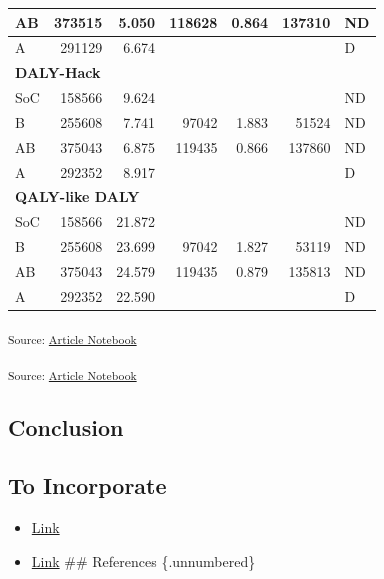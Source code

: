 \documentclass[
]{agujournal2019}
\providecommand{\tightlist}{%
  \setlength{\itemsep}{0pt}\setlength{\parskip}{0pt}}\usepackage{longtable,booktabs,array}
\begin{document}
\begin{table}
\begin{tabular}{l|r|r|r|r|r|l}
\hline
\hspace{1em}AB & 373515 & 5.050 & 118628 & 0.864 & 137310 & ND\\
\hline
\hspace{1em}A & 291129 & 6.674 &  &  &  & D\\
\hline
\multicolumn{7}{l}{\textbf{DALY-Hack}}\\
\hline
\hspace{1em}SoC & 158566 & 9.624 &  &  &  & ND\\
\hline
\hspace{1em}B & 255608 & 7.741 & 97042 & 1.883 & 51524 & ND\\
\hline
\hspace{1em}AB & 375043 & 6.875 & 119435 & 0.866 & 137860 & ND\\
\hline
\hspace{1em}A & 292352 & 8.917 &  &  &  & D\\
\hline
\multicolumn{7}{l}{\textbf{QALY-like DALY}}\\
\hline
\hspace{1em}SoC & 158566 & 21.872 &  &  &  & ND\\
\hline
\hspace{1em}B & 255608 & 23.699 & 97042 & 1.827 & 53119 & ND\\
\hline
\hspace{1em}AB & 375043 & 24.579 & 119435 & 0.879 & 135813 & ND\\
\hline
\hspace{1em}A & 292352 & 22.590 &  &  &  & D\\
\hline
\end{tabular}
\end{table}

\textsubscript{Source:
\href{https://graveja0.github.io/dalys/index.qmd.html}{Article
Notebook}}

\textsubscript{Source:
\href{https://graveja0.github.io/dalys/index.qmd.html}{Article
Notebook}}

\subsection{Conclusion}\label{conclusion}

\subsection{To Incorporate}\label{to-incorporate}

\begin{itemize}
\tightlist
\item
  \href{https://academic.oup.com/heapol/article/21/5/402/578296?login=false}{Link}
\item
  \href{https://link.springer.com/article/10.1007/s40258-022-00722-3}{Link}
  \#\# References \{.unnumbered\}
\end{itemize}
\end{document}
